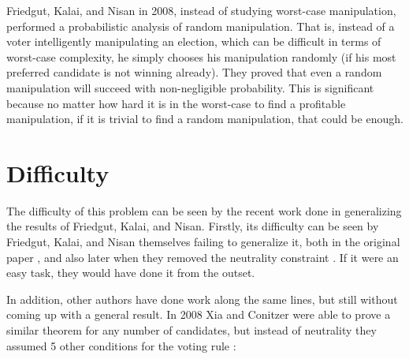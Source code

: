 	Friedgut, Kalai, and Nisan \cite{friedgut2008elections} in 2008, instead of studying worst-case manipulation, performed a probabilistic analysis of random manipulation. That is, instead of a voter intelligently manipulating an election, which can be difficult in terms of worst-case complexity, he simply chooses his manipulation randomly (if his most preferred candidate is not winning already). They proved that even a random manipulation will succeed with non-negligible probability. This is significant because no matter how hard it is in the worst-case to find a profitable manipulation, if it is trivial to find a random manipulation, that could be enough.


\section{Difficulty}

	The difficulty of this problem can be seen by the recent work done in generalizing the results of Friedgut, Kalai, and Nisan. Firstly, its difficulty can be seen by Friedgut, Kalai, and Nisan themselves failing to generalize it, both in the original paper \cite{friedgut2008elections}, and also later when they removed the neutrality constraint \cite{friedgut2011quantitative}. If it were an easy task, they would have done it from the outset.

	In addition, other authors have done work along the same lines, but still without coming up with a general result. In 2008 Xia and Conitzer were able to prove a similar theorem for any number of candidates, but instead of neutrality they assumed 5 other conditions for the voting rule \cite{xia2008sufficient}:


